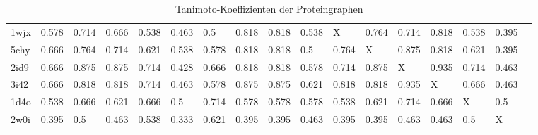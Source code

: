 \documentclass{report}
\begin{document}
\begin{table}
{\begin{tabular}{l l l l l l l l l l l l l l l l l}
1wjx & 0.578 & 0.714 & 0.666 & 0.538 & 0.463 & 0.5 & \cellcolor{fGreen!50}0.818 & \cellcolor{fGreen!100}0.818 & 0.538 &   X   & \cellcolor{fGreen!25}0.764 & 0.714 & \cellcolor{fGreen!75}0.818 & 0.538 & 0.395 &  \\
5chy & 0.666 & 0.764 & 0.714 & 0.621 & 0.538 & 0.578 & \cellcolor{fGreen!75}0.818 & \cellcolor{fGreen!25}0.818 & 0.5 & 0.764 &   X   & \cellcolor{fGreen!100}0.875 & \cellcolor{fGreen!50}0.818 & 0.621 & 0.395 &  \\
2id9 & 0.666 & \cellcolor{fGreen!50}0.875 & \cellcolor{fGreen!25}0.875 & 0.714 & 0.428 & 0.666 & 0.818 & 0.818 & 0.578 & 0.714 & \cellcolor{fGreen!75}0.875 &   X   & \cellcolor{fGreen!100}0.935 & 0.714 & 0.463 &  \\
3i42 & 0.666 & 0.818 & 0.818 & 0.714 & 0.463 & 0.578 & \cellcolor{fGreen!50}0.875 & \cellcolor{fGreen!75}0.875 & 0.621 & \cellcolor{fGreen!25}0.818 & 0.818 & \cellcolor{fGreen!100}0.935 &   X   & 0.666 & 0.463 &  \\
1d4o & 0.538 & \cellcolor{fGreen!50}0.666 & 0.621 & 0.666 & 0.5 & \cellcolor{fGreen!100}0.714 & 0.578 & 0.578 & 0.578 & 0.538 & 0.621 & \cellcolor{fGreen!75}0.714 & \cellcolor{fGreen!25}0.666 &   X   & 0.5 &  \\
2w0i & 0.395 & \cellcolor{fGreen!50}0.5 & 0.463 & \cellcolor{fGreen!75}0.538 & 0.333 & \cellcolor{fGreen!100}0.621 & 0.395 & 0.395 & 0.463 & 0.395 & 0.395 & 0.463 & 0.463 & \cellcolor{fGreen!25}0.5 &   X   &  \\

\end{tabular}}
\caption{Tanimoto-Koeffizienten der Proteingraphen}
\end{table}
\end{document}
